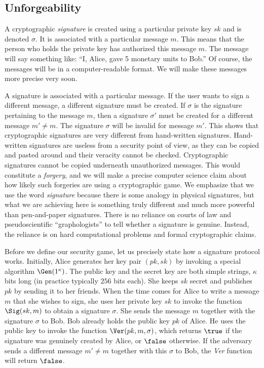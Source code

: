 \subsection*{Unforgeability}

A cryptographic \emph{signature} is created using a particular private key $sk$ and is
denoted
%
$\sigma$.
It is associated with a particular message $m$. This means that
the person who holds the private key has authorized this message $m$. The message
will say something like: ``I, Alice, gave 5 monetary units to Bob.'' Of course, the
messages will be in a computer-readable format. We will make these messages more
precise very soon.

A signature is associated with a particular message. If the user wants to sign a
different message, a different signature must be created. If $\sigma$ is the signature
pertaining to the message $m$, then a signature $\sigma'$ must be created for a
different message $m' \neq m$. The signature $\sigma$ will be invalid for message $m'$.
This shows that cryptographic signatures are very different from hand-written signatures.
Hand-written signatures are useless from a security point of view, as they can be
copied and pasted around and their veracity cannot be checked. Cryptographic
signatures cannot be copied underneath unauthorized messages. This would constitute
a \emph{forgery}, and we will make a precise computer science claim about how
likely such forgeries are using a cryptographic game. We emphasize that we use the
word \emph{signature} because there is some analogy in physical signatures, but
what we are achieving here is something truly different and much more powerful
than pen-and-paper signatures. There is no reliance on courts of law and pseudoscientific
``graphologists'' to tell whether a signature is genuine. Instead, the reliance is
on hard computational problems and formal cryptographic claims.

Before we define our security game, let us precisely state how a signature protocol
works. Initially, Alice generates her key pair $(pk, sk)$ by invoking a special algorithm
%
$\Gen(1^\kappa)$. The public key and the secret key are both simple strings, $\kappa$
bits long (in practice typically $256$ bits each).
She keeps $sk$ secret and publishes $pk$ by
sending it to her friends. When the time comes for Alice to write a message $m$
that she wishes to sign, she uses her private key $sk$ to invoke the function
%
$\Sig(sk, m)$
to obtain a signature $\sigma$. She sends the message $m$ together
with the signature $\sigma$ to Bob. Bob already holds the public key $pk$ of Alice.
He uses the public key to invoke the function
%
$\Ver(pk, m, \sigma)$,
which returns
$\true$ if the signature was genuinely created by Alice, or $\false$ otherwise.
If the adversary sends a different message $m' \neq m$ together with this $\sigma$
to Bob, the \emph{Ver} function will return $\false$.

